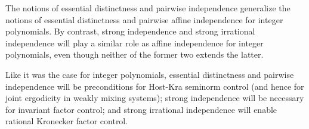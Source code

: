 \documentclass[11pt]{amsart}
\theoremstyle{definition}
\newcommand{\1}{{\mathbf{1}}}
\begin{document}
The notions of essential distinctness and pairwise independence generalize the notions of essential distinctness and pairwise affine independence for integer polynomials. By contrast, strong independence and strong irrational independence will play a similar role as affine independence for integer polynomials, even though neither of the former two extends the latter.

Like it was the case for integer polynomials, essential distinctness and pairwise independence will be preconditions for Host-Kra seminorm control (and hence for joint ergodicity in weakly mixing systems); strong independence will be necessary for invariant factor control; and strong irrational independence will enable rational Kronecker factor control.
\end{document}
